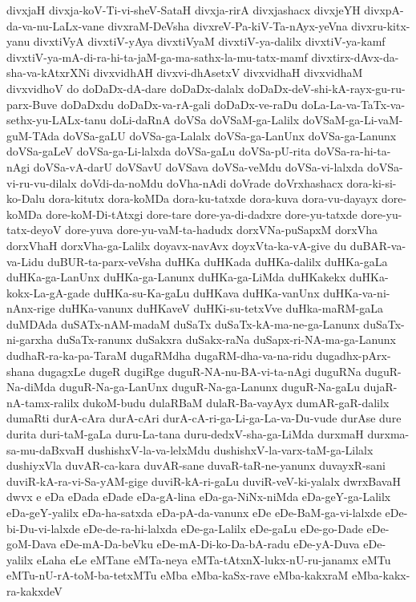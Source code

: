 {divxjaH
divxja-koV-Ti-vi-sheV-SataH
divxja-rirA
divxjashacx
divxjeYH
divxpA-da-va-nu-LaLx-vane
divxraM-DeVsha
divxreV-Pa-kiV-Ta-nAyx-yeVna
divxru-kitx-yanu
divxtiVyA
divxtiV-yAya
divxtiVyaM
divxtiV-ya-dalilx
divxtiV-ya-kamf
divxtiV-ya-mA-di-ra-hi-ta-jaM-ga-ma-sathx-la-mu-tatx-mamf
divxtirx-dAvx-da-sha-va-kAtxrXNi
divxvidhAH
divxvi-dhAsetxV
divxvidhaH
divxvidhaM
divxvidhoV
do
doDaDx-dA-dare
doDaDx-dalalx
doDaDx-deV-shi-kA-rayx-gu-ru-parx-Buve
doDaDxdu
doDaDx-va-rA-gali
doDaDx-ve-raDu
doLa-La-va-TaTx-va-sethx-yu-LALx-tanu
doLi-daRnA
doVSa
doVSaM-ga-Lalilx
doVSaM-ga-Li-vaM-guM-TAda
doVSa-gaLU
doVSa-ga-Lalalx
doVSa-ga-LanUnx
doVSa-ga-Lanunx
doVSa-gaLeV
doVSa-ga-Li-lalxda
doVSa-gaLu
doVSa-pU-rita
doVSa-ra-hi-ta-nAgi
doVSa-vA-darU
doVSavU
doVSava
doVSa-veMdu
doVSa-vi-lalxda
doVSa-vi-ru-vu-dilalx
doVdi-da-noMdu
doVha-nAdi
doVrade
doVrxhashacx
dora-ki-si-ko-Dalu
dora-kitutx
dora-koMDa
dora-ku-tatxde
dora-kuva
dora-vu-dayayx
dore-koMDa
dore-koM-Di-tAtxgi
dore-tare
dore-ya-di-dadxre
dore-yu-tatxde
dore-yu-tatx-deyoV
dore-yuva
dore-yu-vaM-ta-hadudx
dorxVNa-puSapxM
dorxVha
dorxVhaH
dorxVha-ga-Lalilx
doyavx-navAvx
doyxVta-ka-vA-give
du
duBAR-va-va-Lidu
duBUR-ta-parx-veVsha
duHKa
duHKada
duHKa-dalilx
duHKa-gaLa
duHKa-ga-LanUnx
duHKa-ga-Lanunx
duHKa-ga-LiMda
duHKakekx
duHKa-kokx-La-gA-gade
duHKa-su-Ka-gaLu
duHKava
duHKa-vanUnx
duHKa-va-ni-nAnx-rige
duHKa-vanunx
duHKaveV
duHKi-su-tetxVve
duHka-maRM-gaLa
duMDAda
duSATx-nAM-madaM
duSaTx
duSaTx-kA-ma-ne-ga-Lanunx
duSaTx-ni-garxha
duSaTx-ranunx
duSakxra
duSakx-raNa
duSapx-ri-NA-ma-ga-Lanunx
dudhaR-ra-ka-pa-TaraM
dugaRMdha
dugaRM-dha-va-na-ridu
dugadhx-pArx-shana
dugagxLe
dugeR
dugiRge
duguR-NA-nu-BA-vi-ta-nAgi
duguRNa
duguR-Na-diMda
duguR-Na-ga-LanUnx
duguR-Na-ga-Lanunx
duguR-Na-gaLu
dujaR-nA-tamx-ralilx
dukoM-budu
dulaRBaM
dulaR-Ba-vayAyx
dumAR-gaR-dalilx
dumaRti
durA-cAra
durA-cAri
durA-cA-ri-ga-Li-ga-La-va-Du-vude
durAse
dure
durita
duri-taM-gaLa
duru-La-tana
duru-dedxV-sha-ga-LiMda
durxmaH
durxma-sa-mu-daBxvaH
dushishxV-la-va-lelxMdu
dushishxV-la-varx-taM-ga-Lilalx
dushiyxVla
duvAR-ca-kara
duvAR-sane
duvaR-taR-ne-yanunx
duvayxR-sani
duviR-kA-ra-vi-Sa-yAM-gige
duviR-kA-ri-gaLu
duviR-veV-ki-yalalx
dwrxBavaH
dwvx
e
eDa
eDada
eDade
eDa-gA-lina
eDa-ga-NiNx-niMda
eDa-geY-ga-Lalilx
eDa-geY-yalilx
eDa-ha-satxda
eDa-pA-da-vanunx
eDe
eDe-BaM-ga-vi-lalxde
eDe-bi-Du-vi-lalxde
eDe-de-ra-hi-lalxda
eDe-ga-Lalilx
eDe-gaLu
eDe-go-Dade
eDe-goM-Dava
eDe-mA-Da-beVku
eDe-mA-Di-ko-Da-bA-radu
eDe-yA-Duva
eDe-yalilx
eLaha
eLe
eMTane
eMTa-neya
eMTa-tAtxnX-lukx-nU-ru-janamx
eMTu
eMTu-nU-rA-toM-ba-tetxMTu
eMba
eMba-kaSx-rave
eMba-kakxraM
eMba-kakx-ra-kakxdeV
}
